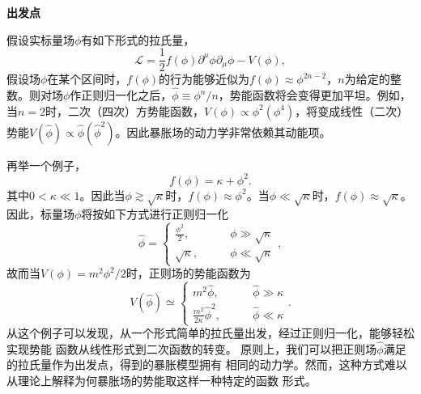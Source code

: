 \textbf{出发点} 

假设实标量场$\phi$有如下形式的拉氏量，
\begin{equation}
  \mathcal{L} =
  \frac{1}{2}f(\phi)\partial^{\mu}\phi\partial_{\mu}\phi-V(\phi),
\end{equation}
假设场$\phi$在某个区间时，$f(\phi)$的行为能够近似为$f(\phi)\approx
\phi^{2n-2}$，$n$为给定的整数。则对场$\phi$作正则归一化之后，$\hat{\phi}\equiv
\phi^{n}/n$，势能函数将会变得更加平坦。例如，当$n=2$时，二次（四次）方势能函数，$V(\phi)\propto
\phi^2(\phi^{4})$，将变成线性（二次）势能$V(\hat{\phi})\propto
\hat{\phi}(\hat{\phi}^2)$。因此暴胀场的动力学非常依赖其动能项。

再举一个例子，
\begin{equation}
  f(\phi) = \kappa + \phi^2. 
\end{equation}
其中$0 < \kappa \ll 1$。因此当$\phi \gtrsim \sqrt{\kappa}$时，$f(\phi)
\approx \phi^2$。当$\phi \ll \sqrt{\kappa}$时，$f(\phi)\approx
\sqrt{\kappa}$。因此，标量场$\phi$将按如下方式进行正则归一化
\begin{equation}
  \hat{\phi} = 
  \begin{cases}
    \frac{\phi^2}{2}, \qquad & \phi \gg \sqrt{\kappa} \\
    \sqrt{\kappa},\qquad & \phi \ll \sqrt{\kappa}
  \end{cases},
\end{equation}
故而当$V(\phi)=m^2\phi^2/ 2$时，正则场的势能函数为
\begin{equation}
  V(\hat{\phi}) \simeq 
  \begin{cases}
    m^2\hat{\phi},\qquad & \hat{\phi} \gg \kappa \\
    \frac{m^2}{2\kappa} \hat{\phi}^2,\qquad & \hat{\phi} \ll \kappa
  \end{cases}.
\end{equation}
从这个例子可以发现，从一个形式简单的拉氏量出发，经过正则归一化，能够轻松实现势能
函数从线性形式到二次函数的转变。
原则上，我们可以把正则场$\hat{\phi}$满足的拉氏量作为出发点，得到的暴胀模型拥有
相同的动力学。然而，这种方式难以从理论上解释为何暴胀场的势能取这样一种特定的函数
形式。


